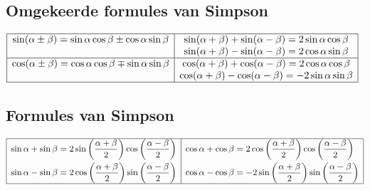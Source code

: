 \documentclass[a5paper]{article}
\begin{document}
\subsection{Omgekeerde formules van Simpson}
$
\begin{array}{|c|c|}
\hline
\sin(\alpha \pm \beta) = \sin\alpha\cos\beta \pm \cos\alpha\sin\beta & 
\sin(\alpha + \beta) + \sin(\alpha - \beta) = 2\sin\alpha\cos\beta \\
& 
\sin(\alpha + \beta) - \sin(\alpha - \beta) = 2\cos\alpha\sin\beta \\
\hline
\cos(\alpha \pm \beta) = \cos\alpha\cos\beta \mp \sin\alpha\sin\beta & 
\cos(\alpha + \beta) + \cos(\alpha - \beta) = 2\cos\alpha\cos\beta \\
& 
\cos(\alpha + \beta) - \cos(\alpha - \beta) = -2\sin\alpha\sin\beta \\
\hline
\end{array}
$
\subsection{Formules van Simpson}
$
\begin{array}{|c|c|}
\hline
\begin{aligned}
\sin \alpha + \sin \beta &= 2\sin\left(\frac{\alpha + \beta}{2}\right)\cos\left(\frac{\alpha - \beta}{2}\right) \\
\sin \alpha - \sin \beta &= 2\cos\left(\frac{\alpha + \beta}{2}\right)\sin\left(\frac{\alpha - \beta}{2}\right)
\end{aligned} & 
\begin{aligned}
\cos \alpha + \cos \beta &= 2\cos\left(\frac{\alpha + \beta}{2}\right)\cos\left(\frac{\alpha - \beta}{2}\right) \\
\cos \alpha - \cos \beta &= -2\sin\left(\frac{\alpha + \beta}{2}\right)\sin\left(\frac{\alpha - \beta}{2}\right)
\end{aligned} \\
\hline
\end{array}
$
\newpage
\end{document}
